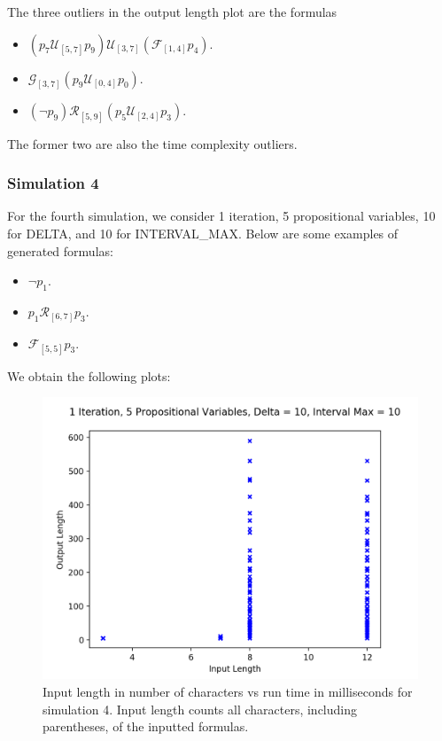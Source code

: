 \documentclass[runningheads]{llncs}
\begin{document}
The three outliers in the output length plot are the formulas 
\begin{itemize}
    \item $(p_7 \mathcal{U}_{[5,7]} p_9) \mathcal{U}_{[3,7]} (\mathcal{F}_{[1,4]} p_4)$.
    \item $\mathcal{G}_{[3,7]} (p_9 \mathcal{U}_{[0,4]} p_0)$.
    \item $(\neg p_9) \mathcal{R}_{[5,9]} (p_5 \mathcal{U}_{[2,4]} p_3)$.
\end{itemize}
The former two are also the time complexity outliers.
\subsubsection{Simulation 4}
For the fourth simulation, we consider 1 iteration, 5 propositional variables, 10 for DELTA, and 10 for INTERVAL\_MAX. Below are some examples of generated formulas:
\begin{itemize}
    \item $\neg p_1$.
    \item $p_1 \mathcal{R}_{[6,7]} p_3$.
    \item $\mathcal{F}_{[5,5]} p_3$.
\end{itemize}
We obtain the following plots:
\begin{figure}[H]
    \centering
    \includegraphics[scale=0.75]{images/Sim4Length.png}
    \caption{Input length in number of characters vs run time in milliseconds for simulation 4. Input length counts all characters, including parentheses, of the inputted formulas.}
\end{figure}
\end{document}
